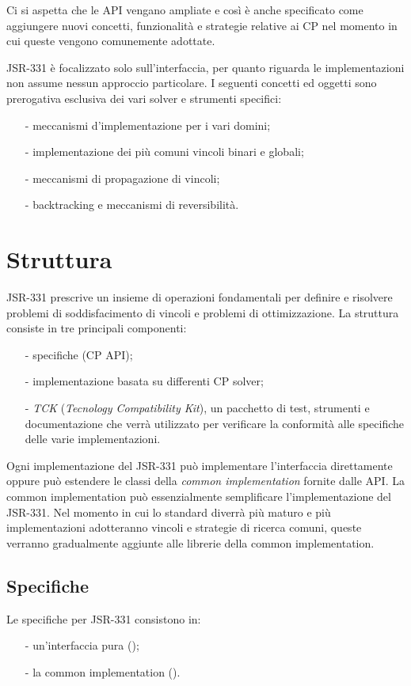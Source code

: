 Ci si aspetta che le API vengano ampliate e così è anche specificato come
aggiungere nuovi concetti, funzionalità e strategie relative ai CP nel momento
in cui queste vengono comunemente adottate.

JSR-331 è focalizzato solo sull'interfaccia, per quanto riguarda le 
implementazioni non assume nessun approccio particolare. I seguenti concetti ed
oggetti sono prerogativa esclusiva dei vari solver e strumenti specifici:
\begin{itemize}
\item[-]meccanismi d'implementazione per i vari domini;
\item[-]implementazione dei più comuni vincoli binari e globali;
\item[-]meccanismi di propagazione di vincoli;
\item[-]backtracking e meccanismi di reversibilità.
\end{itemize}

\section{Struttura}
JSR-331 prescrive un insieme di operazioni fondamentali per definire e risolvere
problemi di soddisfacimento di vincoli e problemi di ottimizzazione.
La struttura consiste in tre principali componenti:
\begin{itemize}
\item[-]specifiche (CP API);
\item[-]implementazione basata su differenti CP solver;
\item[-]\emph{TCK} (\emph{Tecnology Compatibility Kit}), un pacchetto di test,
strumenti e
documentazione che verrà utilizzato per verificare la conformità alle
specifiche delle varie implementazioni.
\end{itemize}

Ogni implementazione del JSR-331 può implementare l'interfaccia direttamente
oppure può estendere le classi della \emph{common implementation} fornite
dalle API. La common implementation può essenzialmente semplificare
l'implementazione del JSR-331. Nel momento in cui lo standard diverrà più 
maturo e più
implementazioni adotteranno vincoli e strategie di ricerca comuni, queste
verranno gradualmente aggiunte alle librerie della common implementation.

\subsection{Specifiche}
Le specifiche per JSR-331 consistono in:
\begin{itemize}
\item[-]un'interfaccia pura ();
\item[-]la common implementation ().
\end{itemize}

